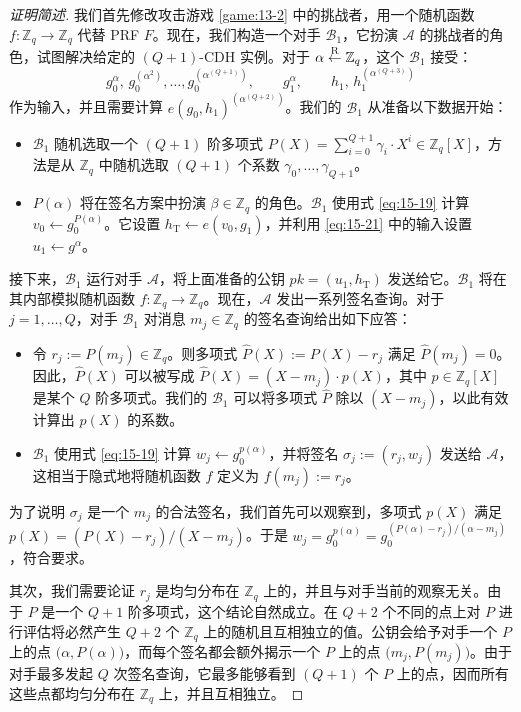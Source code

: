 \begin{proof}[证明简述]
我们首先修改攻击游戏 \ref{game:13-2} 中的挑战者，用一个随机函数 $f:\mathbb{Z}_q\to\mathbb{Z}_q$ 代替 PRF $F$。现在，我们构造一个对手 $\mathcal{B}_1$，它扮演 $\mathcal{A}$ 的挑战者的角色，试图解决给定的 $(Q+1)$-CDH 实例。对于 $\alpha\overset{\rm R}\leftarrow\mathbb{Z}_q$，这个 $\mathcal{B}_1$ 接受：
\begin{equation}\label{eq:15-21}
g_0^\alpha,\,g_0^{(\alpha^2)},\dots,g_0^{(\alpha^{(Q+1)})},
\quad\quad
g_1^\alpha,
\quad\quad
h_1,\,h_1^{(\alpha^{(Q+3)})}
\end{equation}
作为输入，并且需要计算 $e(g_0,h_1)^{(\alpha^{(Q+2)})}$。我们的 $\mathcal{B}_1$ 从准备以下数据开始：
\begin{itemize}
	\item $\mathcal{B}_1$ 随机选取一个 $(Q+1)$ 阶多项式 $P(X)=\sum_{i=0}^{Q+1}\gamma_i\cdot X^i\in\mathbb{Z}_q[X]$，方法是从 $\mathbb{Z}_q$ 中随机选取 $(Q+1)$ 个系数 $\gamma_0,\dots,\gamma_{Q+1}$。
	\item $P(\alpha)$ 将在签名方案中扮演 $\beta\in\mathbb{Z}_q$ 的角色。$\mathcal{B}_1$ 使用式 \ref{eq:15-19} 计算 $v_0\leftarrow g_0^{P(\alpha)}$。它设置 $h_\mathrm{T}\leftarrow e(v_0,g_1)$，并利用 \ref{eq:15-21} 中的输入设置 $u_1\leftarrow g^\alpha$。
\end{itemize}
接下来，$\mathcal{B}_1$ 运行对手 $\mathcal{A}$，将上面准备的公钥 $pk=(u_1,h_\mathrm{T})$ 发送给它。$\mathcal{B}_1$ 将在其内部模拟随机函数 $f:\mathbb{Z}_q\to\mathbb{Z}_q$。现在，$\mathcal{A}$ 发出一系列签名查询。对于 $j=1,\dots,Q$，对手 $\mathcal{B}_1$ 对消息 $m_j\in\mathbb{Z}_q$ 的签名查询给出如下应答：
\begin{itemize}
	\item 令 $r_j:=P(m_j)\in\mathbb{Z}_q$。则多项式 $\hat{P}(X):=P(X)-r_j$ 满足 $\hat{P}(m_j)=0$。因此，$\hat{P}(X)$ 可以被写成 $\hat{P}(X)=(X-m_j)\cdot p(X)$，其中 $p\in\mathbb{Z}_q[X]$ 是某个 $Q$ 阶多项式。我们的 $\mathcal{B}_1$ 可以将多项式 $\hat{P}$ 除以 $(X-m_j)$，以此有效计算出 $p(X)$ 的系数。
	\item $\mathcal{B}_1$ 使用式 \ref{eq:15-19} 计算 $w_j\leftarrow g_0^{p(\alpha)}$，并将签名 $\sigma_j:=(r_j,w_j)$ 发送给 $\mathcal{A}$，这相当于隐式地将随机函数 $f$ 定义为 $f(m_j):=r_j$。
\end{itemize}
为了说明 $\sigma_j$ 是一个 $m_j$ 的合法签名，我们首先可以观察到，多项式 $p(X)$ 满足 $p(X)=(P(X)-r_j)/(X-m_j)$。于是 $w_j=g_0^{p(\alpha)}=g_0^{(P(\alpha)-r_j)/(\alpha-m_j)}$，符合要求。

其次，我们需要论证 $r_j$ 是均匀分布在 $\mathbb{Z}_q$ 上的，并且与对手当前的观察无关。由于 $P$ 是一个 $Q+1$ 阶多项式，这个结论自然成立。在 $Q+2$ 个不同的点上对 $P$ 进行评估将必然产生 $Q+2$ 个 $\mathbb{Z}_q$ 上的随机且互相独立的值。公钥会给予对手一个 $P$ 上的点 $\big(\alpha,P(\alpha)\big)$，而每个签名都会额外揭示一个 $P$ 上的点 $\big(m_j,P(m_j)\big)$。由于对手最多发起 $Q$ 次签名查询，它最多能够看到 $(Q+1)$ 个 $P$ 上的点，因而所有这些点都均匀分布在 $\mathbb{Z}_q$ 上，并且互相独立。


\end{proof}
